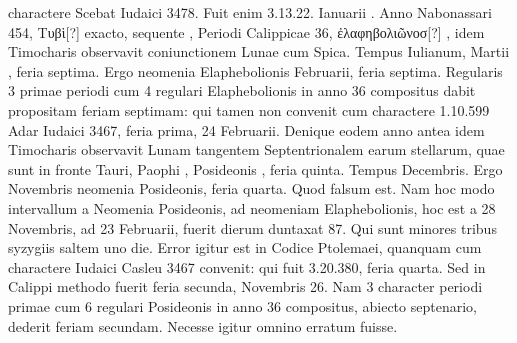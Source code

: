 charactere Scebat Iudaici 3478.
Fuit enim 3.13.22. Ianuarii .
Anno Nabonassari 454, \textgreek{Τυβὶ[?] }
 exacto, sequente \textgreek{}, Periodi Calippicae
36, \textgreek{ἐλαφηβολιῶνοσ[?] }, idem
 Timocharis observavit coniunctionem
Lunae cum Spica.
Tempus Iulianum, Martii , feria septima.
Ergo neomenia Elaphebolionis  Februarii, feria septima.
Regularis
3 primae periodi cum 4 regulari Elaphebolionis in anno 36 compositus
dabit propositam feriam septimam: qui tamen non convenit
cum charactere 1.10.599 Adar Iudaici 3467, feria prima, 24 Februarii.
Denique eodem anno antea idem Timocharis observavit
Lunam tangentem Septentrionalem earum stellarum, quae sunt in
fronte Tauri, Paophi , Posideonis , feria quinta.
Tempus 
Decembris.
Ergo  Novembris neomenia Posideonis, feria
quarta.
Quod falsum est.
Nam hoc modo intervallum a Neomenia
Posideonis, ad neomeniam Elaphebolionis, hoc est a 28 Novembris,
ad 23 Februarii, fuerit dierum duntaxat 87.
Qui sunt minores tribus syzygiis
saltem uno die.
Error igitur est in Codice Ptolemaei, quanquam
cum charactere Iudaici Casleu 3467 convenit: qui fuit 3.20.380,
feria quarta.
Sed in Calippi methodo fuerit feria secunda, Novembris
26.
Nam 3 character periodi primae cum 6 regulari Posideonis
in anno 36 compositus, abiecto septenario, dederit feriam secundam.
Necesse igitur omnino erratum fuisse.
%

\bigskip %



%
